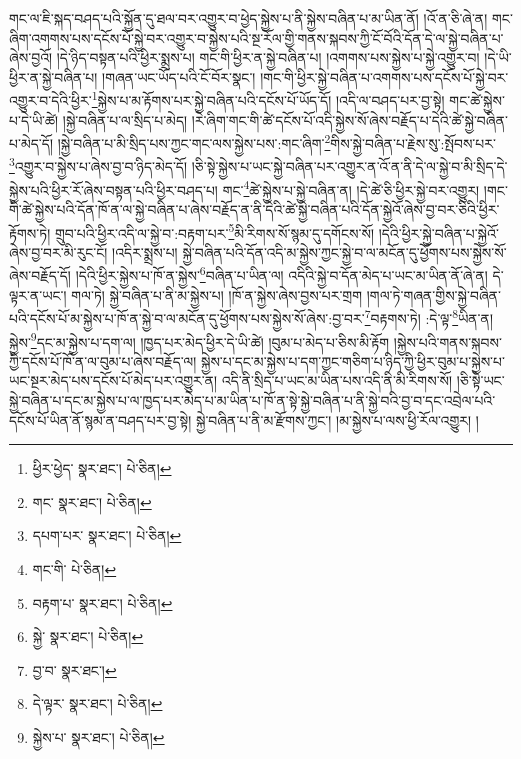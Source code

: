 གང་ལ་ཇི་སྐད་བཤད་པའི་སྐྱོན་དུ་ཐལ་བར་འགྱུར་བ་ཕྱེད་སྐྱེས་པ་ནི་སྐྱེས་བཞིན་པ་མ་ཡིན་ནོ། །འོ་ན་ཅི་ཞེ་ན། གང་ཞིག་འགགས་པས་དངོས་པོ་སྐྱེ་བར་འགྱུར་བ་སྐྱེས་པའི་སྔ་རོལ་གྱི་གནས་སྐབས་ཀྱི་ངོ་བོའི་དོན་དེ་ལ་སྐྱེ་བཞིན་པ་ཞེས་བྱའོ། །དེ་ཉིད་བསྟན་པའི་ཕྱིར་སྨྲས་པ། གང་གི་ཕྱིར་ན་སྐྱེ་བཞིན་པ། །འགགས་པས་སྐྱེས་པ་སྐྱེ་འགྱུར་བ། །དེ་ཡི་ཕྱིར་ན་སྐྱེ་བཞིན་པ། །གཞན་ཡང་ཡོད་པའི་ངོ་བོར་སྣང་། །གང་གི་ཕྱིར་སྐྱེ་བཞིན་པ་འགགས་པས་དངོས་པོ་སྐྱེ་བར་འགྱུར་བ་དེའི་ཕྱིར་\footnote{ཕྱིར་ཕྱེད་  སྣར་ཐང་།  པེ་ཅིན། }སྐྱེས་པ་མ་རྟོགས་པར་སྐྱེ་བཞིན་པའི་དངོས་པོ་ཡོད་དོ། །འདི་ལ་བཤད་པར་བྱ་སྟེ། གང་ཚེ་སྐྱེས་པ་དེ་ཡི་ཚེ། །སྐྱེ་བཞིན་པ་ལ་སྲིད་པ་མེད། །རེ་ཞིག་གང་གི་ཚེ་དངོས་པོ་འདི་སྐྱེས་སོ་ཞེས་བརྗོད་པ་དེའི་ཚེ་སྐྱེ་བཞིན་པ་མེད་དོ། །སྐྱེ་བཞིན་པ་མི་སྲིད་པས་ཀྱང་གང་ལས་སྐྱེས་པས་:གང་ཞིག་\footnote{གང་  སྣར་ཐང་།  པེ་ཅིན། }གིས་སྐྱེ་བཞིན་པ་རྗེས་སུ་:སྤོབས་པར་\footnote{དཔག་པར་  སྣར་ཐང་།  པེ་ཅིན། }འགྱུར་བ་སྐྱེས་པ་ཞེས་བྱ་བ་ཉིད་མེད་དོ། །ཅི་སྟེ་སྐྱེས་པ་ཡང་སྐྱེ་བཞིན་པར་འགྱུར་ན་འོ་ན་ནི་དེ་ལ་སྐྱེ་བ་མི་སྲིད་དེ་སྐྱེས་པའི་ཕྱིར་རོ་ཞེས་བསྟན་པའི་ཕྱིར་བཤད་པ། གང་\footnote{གང་གི་  པེ་ཅིན། }ཚེ་སྐྱེས་པ་སྐྱེ་བཞིན་ན། །དེ་ཚེ་ཅི་ཕྱིར་སྐྱེ་བར་འགྱུར། །གང་གི་ཚེ་སྐྱེས་པའི་དོན་ཁོ་ན་ལ་སྐྱེ་བཞིན་པ་ཞེས་བརྗོད་ན་ནི་དེའི་ཚེ་སྐྱེ་བཞིན་པའི་དོན་སྐྱེའོ་ཞེས་བྱ་བར་ཅིའི་ཕྱིར་རྟོགས་ཏེ། གྲུབ་པའི་ཕྱིར་འདི་ལ་སྐྱེ་བ་:བརྟག་པར་\footnote{བརྟག་པ་  སྣར་ཐང་།  པེ་ཅིན། }མི་རིགས་སོ་སྙམ་དུ་དགོངས་སོ། །དེའི་ཕྱིར་སྐྱེ་བཞིན་པ་སྐྱེའོ་ཞེས་བྱ་བར་མི་རུང་ངོ། །འདིར་སྨྲས་པ། སྐྱེ་བཞིན་པའི་དོན་འདི་མ་སྐྱེས་ཀྱང་སྐྱེ་བ་ལ་མངོན་དུ་ཕྱོགས་པས་སྐྱེས་སོ་ཞེས་བརྗོད་དོ། །དེའི་ཕྱིར་སྐྱེས་པ་ཁོ་ན་སྐྱེས་\footnote{སྐྱེ་  སྣར་ཐང་།  པེ་ཅིན། }བཞིན་པ་ཡིན་ལ། འདིའི་སྐྱེ་བ་དོན་མེད་པ་ཡང་མ་ཡིན་ནོ་ཞེ་ན། དེ་ལྟར་ན་ཡང་། གལ་ཏེ། སྐྱེ་བཞིན་པ་ནི་མ་སྐྱེས་པ། །ཁོ་ན་སྐྱེས་ཞེས་བྱས་པར་གྲག །གལ་ཏེ་གཞན་གྱིས་སྐྱེ་བཞིན་པའི་དངོས་པོ་མ་སྐྱེས་པ་ཁོ་ན་སྐྱེ་བ་ལ་མངོན་དུ་ཕྱོགས་པས་སྐྱེས་སོ་ཞེས་:བྱ་བར་\footnote{བྱ་བ་  སྣར་ཐང་། }བརྟགས་ཏེ། :དེ་ལྟ་\footnote{དེ་ལྟར་  སྣར་ཐང་།  པེ་ཅིན། }ཡིན་ན། སྐྱེས་\footnote{སྐྱེས་པ་  སྣར་ཐང་།  པེ་ཅིན། }དང་མ་སྐྱེས་པ་དག་ལ། །ཁྱད་པར་མེད་ཕྱིར་དེ་ཡི་ཚེ། །བུམ་པ་མེད་པ་ཅིས་མི་རྟོག །སྐྱེས་པའི་གནས་སྐབས་ཀྱི་དངོས་པོ་ཁོ་ན་ལ་བུམ་པ་ཞེས་བརྗོད་ལ། སྐྱེས་པ་དང་མ་སྐྱེས་པ་དག་ཀྱང་གཅིག་པ་ཉིད་ཀྱི་ཕྱིར་བུམ་པ་སྐྱེས་པ་ཡང་སྔར་མེད་པས་དངོས་པོ་མེད་པར་འགྱུར་ན། འདི་ནི་སྲིད་པ་ཡང་མ་ཡིན་པས་འདི་ནི་མི་རིགས་སོ། །ཅི་སྟེ་ཡང་སྐྱེ་བཞིན་པ་དང་མ་སྐྱེས་པ་ལ་ཁྱད་པར་མེད་པ་མ་ཡིན་པ་ཁོ་ན་སྟེ་སྐྱེ་བཞིན་པ་ནི་སྐྱེ་བའི་བྱ་བ་དང་འབྲེལ་པའི་དངོས་པོ་ཡིན་ནོ་སྙམ་ན་བཤད་པར་བྱ་སྟེ། སྐྱེ་བཞིན་པ་ནི་མ་རྫོགས་ཀྱང་། །མ་སྐྱེས་པ་ལས་ཕྱི་རོལ་འགྱུར། །
